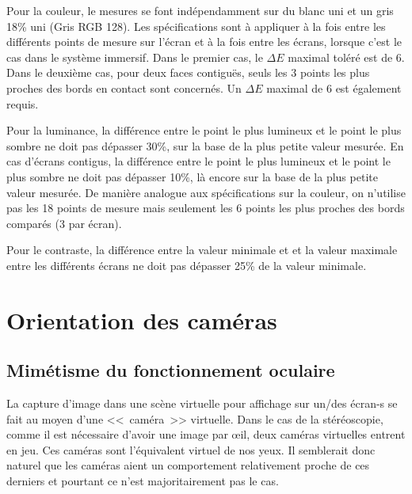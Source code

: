 	\par Pour la couleur, le mesures se font indépendamment sur du blanc uni et un gris 18\% uni (Gris RGB 128). Les spécifications sont à appliquer à la fois entre les différents points de mesure sur l'écran et à la fois entre les écrans, lorsque c'est le cas dans le système immersif. Dans le premier cas, le $\Delta E$ maximal toléré est de 6. Dans le deuxième cas, pour deux faces contiguës, seuls les 3 points les plus proches des bords en contact sont concernés. Un $\Delta E$ maximal de 6 est également requis.
	
	\par Pour la luminance, la différence entre le point le plus lumineux et le point le plus sombre ne doit pas dépasser 30\%, sur la base de la plus petite valeur mesurée. En cas d'écrans contigus, la différence entre le point le plus lumineux et le point le plus sombre ne doit pas dépasser 10\%, là encore sur la base de la plus petite valeur mesurée. De manière analogue aux spécifications sur la couleur, on n'utilise pas les 18 points de mesure mais seulement les 6 points les plus proches des bords comparés (3 par écran).
	
	\par Pour le contraste, la différence entre la valeur minimale et et la valeur maximale entre les différents écrans ne doit pas dépasser 25\% de la valeur minimale.
	
	\section{Orientation des caméras}	
	\subsection{Mimétisme du fonctionnement oculaire}	
	\par La capture d'image dans une scène virtuelle pour affichage sur un/des écran-s se fait au moyen d'une <<~caméra~>> virtuelle. Dans le cas de la stéréoscopie, comme il est nécessaire d'avoir une image par œil, deux caméras virtuelles entrent en jeu. Ces caméras sont l'équivalent virtuel de nos yeux. Il semblerait donc naturel que les caméras aient un comportement relativement proche de ces derniers et pourtant ce n'est majoritairement pas le cas.
	
